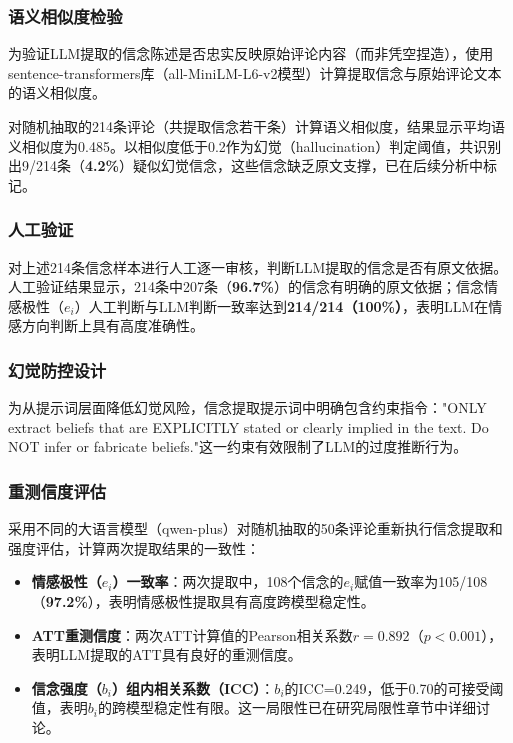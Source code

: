 \subsubsection{语义相似度检验}

为验证LLM提取的信念陈述是否忠实反映原始评论内容（而非凭空捏造），使用sentence-transformers库（all-MiniLM-L6-v2模型）计算提取信念与原始评论文本的语义相似度。

对随机抽取的214条评论（共提取信念若干条）计算语义相似度，结果显示平均语义相似度为0.485。以相似度低于0.2作为幻觉（hallucination）判定阈值，共识别出9/214条（\textbf{4.2\%}）疑似幻觉信念，这些信念缺乏原文支撑，已在后续分析中标记。

\subsubsection{人工验证}

对上述214条信念样本进行人工逐一审核，判断LLM提取的信念是否有原文依据。人工验证结果显示，214条中207条（\textbf{96.7\%}）的信念有明确的原文依据；信念情感极性（$e_i$）人工判断与LLM判断一致率达到\textbf{214/214（100\%）}，表明LLM在情感方向判断上具有高度准确性。

\subsubsection{幻觉防控设计}

为从提示词层面降低幻觉风险，信念提取提示词中明确包含约束指令："ONLY extract beliefs that are EXPLICITLY stated or clearly implied in the text. Do NOT infer or fabricate beliefs."这一约束有效限制了LLM的过度推断行为。

\subsubsection{重测信度评估}

采用不同的大语言模型（qwen-plus）对随机抽取的50条评论重新执行信念提取和强度评估，计算两次提取结果的一致性：

\begin{itemize}
  \item \textbf{情感极性（$e_i$）一致率}：两次提取中，108个信念的$e_i$赋值一致率为105/108（\textbf{97.2\%}），表明情感极性提取具有高度跨模型稳定性。
  \item \textbf{ATT重测信度}：两次ATT计算值的Pearson相关系数$r=0.892$（$p<0.001$），表明LLM提取的ATT具有良好的重测信度。
  \item \textbf{信念强度（$b_i$）组内相关系数（ICC）}：$b_i$的ICC=0.249，低于0.70的可接受阈值，表明$b_i$的跨模型稳定性有限。这一局限性已在研究局限性章节中详细讨论。
\end{itemize}

